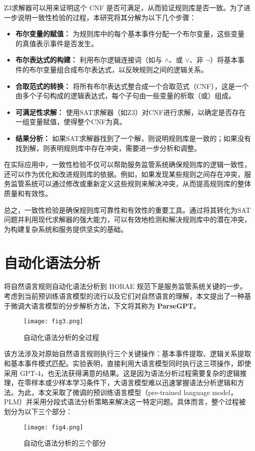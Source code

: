 Z3求解器可以用来证明这个 CNF 是否可满足，从而验证规则库是否一致。为了进一步说明一致性检验的过程，本研究将其分解为以下几个步骤：

\begin{itemize}
    \item \textbf{布尔变量的赋值：} 为规则库中的每个基本事件分配一个布尔变量，这些变量的真值表示事件是否发生。
    \item \textbf{布尔表达式的构建：} 利用布尔逻辑连接词（如与 $\land$、或 $\lor$、非 $\neg$）将基本事件的布尔变量组合成布尔表达式，以反映规则之间的逻辑关系。
    \item \textbf{合取范式的转换：} 将所有布尔表达式整合成一个合取范式（CNF），这是一个由多个子句构成的逻辑表达式，每个子句由一些变量的析取（或）组成。
    \item \textbf{可满足性求解：} 使用SAT求解器（如Z3）对CNF进行求解，以确定是否存在一组变量赋值，使得整个CNF为真。
    \item \textbf{结果分析：} 如果SAT求解器找到了一个解，则说明规则库是一致的；如果没有找到解，则表明规则库中存在冲突，需要进一步分析和调整。
\end{itemize}

在实际应用中，一致性检验不仅可以帮助服务监管系统确保规则库的逻辑一致性，还可以作为优化和改进规则库的依据。例如，如果发现某些规则之间存在冲突，服务监管系统可以通过修改或重新定义这些规则来解决冲突，从而提高规则库的整体质量和有效性。

总之，一致性检验是确保规则库可靠性和有效性的重要工具。通过将其转化为SAT问题并利用现代求解器的强大能力，可以有效地检测和解决规则库中的潜在冲突，为构建复杂系统和服务提供坚实的基础。

\newpage

\section{自动化语法分析}\label{自动化语法分析}

将自然语言规则自动化语法分析到 HORAE 规范下是服务监管系统关键的一步。考虑到当前预训练语言模型的流行以及它们对自然语言的理解，本文提出了一种基于微调大语言模型的分步解析方法，下文将其称为 \textbf{ParseGPT}。

\begin{figure*}[ht]
\centering
\texttt{[image: fig3.png]}
\caption{自动化语法分析的全过程}
\end{figure*}
该方法涉及对原始自然语言规则执行三个关键操作：基本事件提取、逻辑关系提取和基本事件模式匹配。实验表明，直接利用大语言模型同时执行这三项操作，即使采用 GPT-4\cite{achiam2023gpt}，也无法获得满意的结果。这是因为语法分析过程需要复杂的逻辑推理，在零样本或少样本学习条件下，大语言模型难以迅速掌握语法分析逻辑和方法。为此，本文采取了微调的预训练语言模型\cite{edunov2019pre}（pre-trained language
model，PLM）并采用分段式语法分析策略来解决这一特定问题。具体而言，整个过程被划分为以下三个部分：
\begin{figure*}[ht]
    \centering
    \texttt{[image: fig4.png]}
    \caption{自动化语法分析的三个部分}
    \label{fig111}
    \end{figure*}
